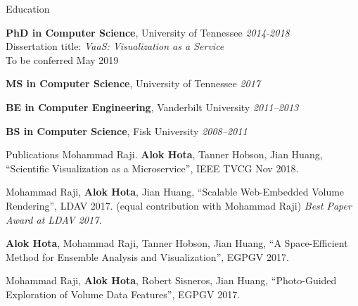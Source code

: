 \documentclass{resume} %
\begin{document}

\begin{rSection}{Education}

{{\bf PhD in Computer Science}, University of Tennessee} \hfill {\em 2014-2018} \\ 
Dissertation title: \emph{VaaS: Visualization as a Service}\\
To be conferred May 2019

{{\bf MS in Computer Science}, University of Tennessee} \hfill {\em 2017}

{{\bf BE in Computer Engineering}, Vanderbilt University} \hfill {\em 2011--2013}

{{\bf BS in Computer Science}, Fisk University} \hfill {\em 2008--2011}

\end{rSection}


\begin{rSection}{Publications}
    Mohammad Raji. \textbf{Alok Hota}, Tanner Hobson, Jian Huang, ``Scientific Visualization as a Microservice'', IEEE TVCG Nov 2018. \href{https://doi.org/10.1109/TVCG.2018.2879672}{\faLink}

    Mohammad Raji, \textbf{Alok Hota}, Jian Huang, ``Scalable Web-Embedded Volume Rendering'', LDAV 2017. (equal contribution with Mohammad Raji)
    \textit{Best Paper Award at LDAV 2017.} \href{http://web.eecs.utk.edu/~ahota/pdfs/tapestry-ldav-2017.pdf}{\faFileTextO}
    
    \textbf{Alok Hota}, Mohammad Raji, Tanner Hobson, Jian Huang, ``A Space-Efficient Method for Ensemble Analysis and Visualization'', EGPGV 2017. \href{http://web.eecs.utk.edu/~ahota/pdfs/nea-egpgv-2017.pdf}{\faFileTextO}
    
    Mohammad Raji, \textbf{Alok Hota}, Robert Sisneros, Jian Huang, ``Photo-Guided Exploration of Volume Data Features'', EGPGV 2017. \href{http://web.eecs.utk.edu/~ahota/pdfs/photoguided-egpgv-2017.pdf}{\faFileTextO}
\end{rSection}

\end{document}
